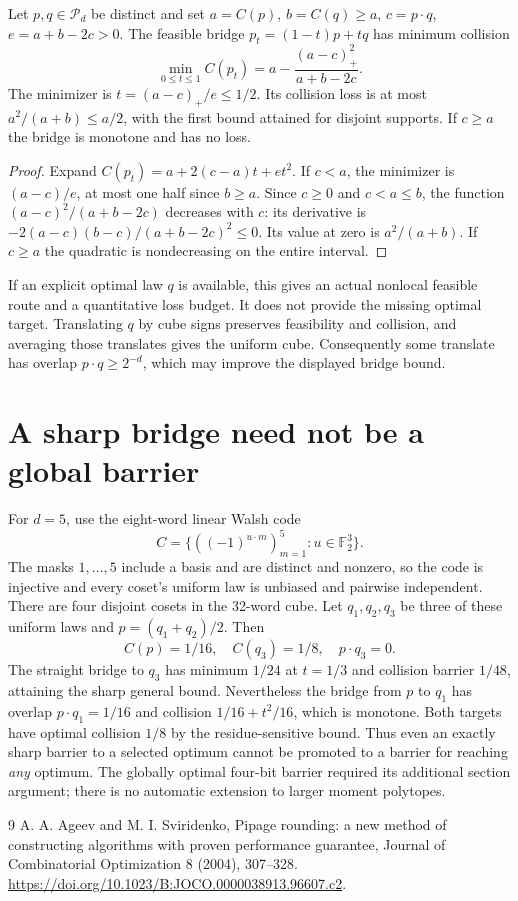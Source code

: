 \begin{theorem}
Let $p,q\in\mathcal P_d$ be distinct and set
$a=C(p)$, $b=C(q)\ge a$, $c=p\cdot q$, $e=a+b-2c>0$.
The feasible bridge $p_t=(1-t)p+tq$ has minimum collision
\[
 \min_{0\le t\le1}C(p_t)
 =a-\frac{(a-c)_+^2}{a+b-2c}.
\]
The minimizer is $t=(a-c)_+/e\le1/2$. Its collision loss is at most
$a^2/(a+b)\le a/2$, with the first bound attained for disjoint
supports. If $c\ge a$ the bridge is monotone and has no loss.
\end{theorem}
\begin{proof}
Expand $C(p_t)=a+2(c-a)t+et^2$. If $c<a$, the minimizer is
$(a-c)/e$, at most one half since $b\ge a$. Since $c\ge0$ and
$c<a\le b$, the function $(a-c)^2/(a+b-2c)$ decreases with $c$:
its derivative is $-2(a-c)(b-c)/(a+b-2c)^2\le0$.
Its value at zero is $a^2/(a+b)$. If $c\ge a$ the quadratic is
nondecreasing on the entire interval.
\end{proof}
If an explicit optimal law $q$ is available, this gives an actual
nonlocal feasible route and a quantitative loss budget. It does not
provide the missing optimal target. Translating $q$ by cube signs
preserves feasibility and collision, and averaging those translates
gives the uniform cube. Consequently some translate has overlap
$p\cdot q\ge2^{-d}$, which may improve the displayed bridge bound.

\section*{A sharp bridge need not be a global barrier}
For $d=5$, use the eight-word linear Walsh code
\[
 C=\{((-1)^{u\cdot m})_{m=1}^5:u\in\mathbb F_2^3\}.
\]
The masks $1,\ldots,5$ include a basis and are distinct and nonzero,
so the code is injective and every coset's uniform law is unbiased
and pairwise independent. There are four disjoint cosets in the
32-word cube. Let $q_1,q_2,q_3$ be three of these uniform laws and
$p=(q_1+q_2)/2$. Then
\[
 C(p)=1/16,\quad C(q_3)=1/8,\quad p\cdot q_3=0.
\]
The straight bridge to $q_3$ has minimum $1/24$ at $t=1/3$ and
collision barrier $1/48$, attaining the sharp general bound.
Nevertheless the bridge from $p$ to $q_1$ has overlap $p\cdot q_1=1/16$
and collision $1/16+t^2/16$, which is monotone. Both targets have
optimal collision $1/8$ by the residue-sensitive bound.
Thus even an exactly sharp barrier to a selected optimum cannot be
promoted to a barrier for reaching \emph{any} optimum. The globally
optimal four-bit barrier required its additional section argument;
there is no automatic extension to larger moment polytopes.

\begin{thebibliography}{9}
 A. A. Ageev and M. I. Sviridenko, Pipage rounding:
a new method of constructing algorithms with proven performance
guarantee, Journal of Combinatorial Optimization 8 (2004), 307--328.
\url{https://doi.org/10.1023/B:JOCO.0000038913.96607.c2}.
\end{thebibliography}

